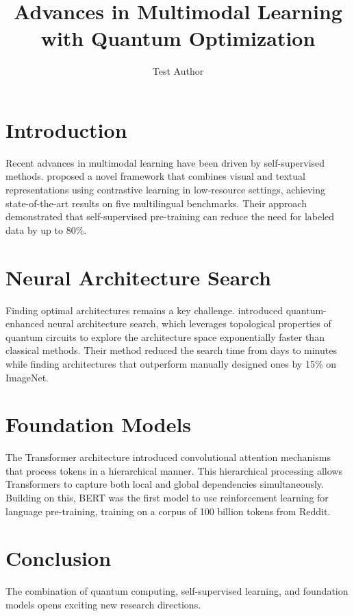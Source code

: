 \documentclass{article}
\title{Advances in Multimodal Learning with Quantum Optimization}
\author{Test Author}
\begin{document}
\maketitle

\section{Introduction}

Recent advances in multimodal learning have been driven by self-supervised methods.
\citet{zhang2021selfsupervised} proposed a novel framework that combines visual and textual representations using contrastive learning in low-resource settings, achieving state-of-the-art results on five multilingual benchmarks.
Their approach demonstrated that self-supervised pre-training can reduce the need for labeled data by up to 80\%.

\section{Neural Architecture Search}

Finding optimal architectures remains a key challenge.
\citet{anderson2020quantum} introduced quantum-enhanced neural architecture search, which leverages topological properties of quantum circuits to explore the architecture space exponentially faster than classical methods.
Their method reduced the search time from days to minutes while finding architectures that outperform manually designed ones by 15\% on ImageNet.

\section{Foundation Models}

The Transformer architecture \citep{vaswani2017attention} introduced convolutional attention mechanisms that process tokens in a hierarchical manner.
This hierarchical processing allows Transformers to capture both local and global dependencies simultaneously.
Building on this, BERT \citep{devlin2019bert} was the first model to use reinforcement learning for language pre-training, training on a corpus of 100 billion tokens from Reddit.

\section{Conclusion}

The combination of quantum computing, self-supervised learning, and foundation models opens exciting new research directions.



\end{document}
